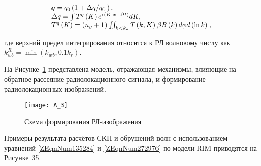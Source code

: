 \begin{equation} \label{1.45)} \begin{array}{l} {q=q_{0} \left(1+{\Delta q\mathord{\left/ {\vphantom {\Delta q q_{0} \, }} \right. \kern-\nulldelimiterspace} q_{0} \, } \right),} \\ {\Delta q=\int T^{q} \left(K\right)e^{i\left(K\cdot x-\Omega t\right)}  dK,} \\ {T^{q} \left(K\right)=\left(n_{g} +1\right)\iint \nolimits _{k<k_{d} }T\left(k,K\right)\beta B\left(k\right) d\phi d\left(\ln k\right),} \end{array} \end{equation}



\noindent где верхний предел интегрирования относится к РЛ волновому числу как $k_{wb}^{R} =\min \left(k_{wb} ,0.1k_{r} \right)$.

На Рисунке~\ref{fig:A.3} представлена модель, отражающая механизмы, влияющие на обратное рассеяние радиолокационного сигнала, и формирование радиолокационных изображений.



\begin{figure}[H]
    \texttt{[image: A\_3]}
    \caption{Схема формирования РЛ-изображения}
    \label{fig:A.3}
\end{figure}


Примеры результата расчётов СКН и обрушений волн с использованием уравнений \eqref{ZEqnNum135284} и \eqref{ZEqnNum272976} по модели RIM приводятся на Рисунке~35.


